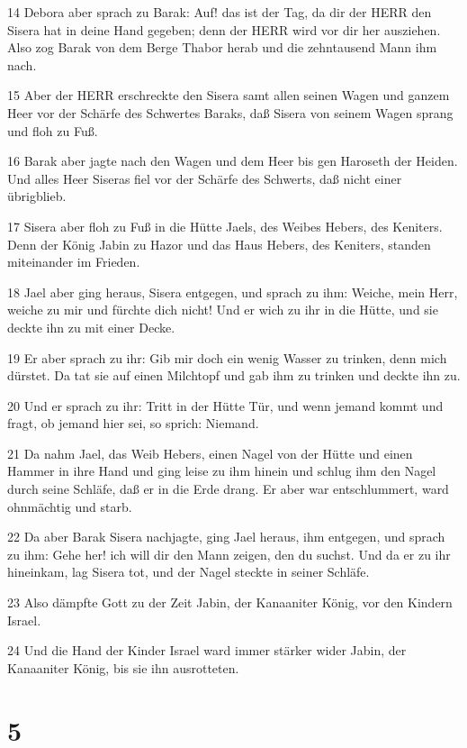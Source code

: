 \par 14 Debora aber sprach zu Barak: Auf! das ist der Tag, da dir der HERR den Sisera hat in deine Hand gegeben; denn der HERR wird vor dir her ausziehen. Also zog Barak von dem Berge Thabor herab und die zehntausend Mann ihm nach.
\par 15 Aber der HERR erschreckte den Sisera samt allen seinen Wagen und ganzem Heer vor der Schärfe des Schwertes Baraks, daß Sisera von seinem Wagen sprang und floh zu Fuß.
\par 16 Barak aber jagte nach den Wagen und dem Heer bis gen Haroseth der Heiden. Und alles Heer Siseras fiel vor der Schärfe des Schwerts, daß nicht einer übrigblieb.
\par 17 Sisera aber floh zu Fuß in die Hütte Jaels, des Weibes Hebers, des Keniters. Denn der König Jabin zu Hazor und das Haus Hebers, des Keniters, standen miteinander im Frieden.
\par 18 Jael aber ging heraus, Sisera entgegen, und sprach zu ihm: Weiche, mein Herr, weiche zu mir und fürchte dich nicht! Und er wich zu ihr in die Hütte, und sie deckte ihn zu mit einer Decke.
\par 19 Er aber sprach zu ihr: Gib mir doch ein wenig Wasser zu trinken, denn mich dürstet. Da tat sie auf einen Milchtopf und gab ihm zu trinken und deckte ihn zu.
\par 20 Und er sprach zu ihr: Tritt in der Hütte Tür, und wenn jemand kommt und fragt, ob jemand hier sei, so sprich: Niemand.
\par 21 Da nahm Jael, das Weib Hebers, einen Nagel von der Hütte und einen Hammer in ihre Hand und ging leise zu ihm hinein und schlug ihm den Nagel durch seine Schläfe, daß er in die Erde drang. Er aber war entschlummert, ward ohnmächtig und starb.
\par 22 Da aber Barak Sisera nachjagte, ging Jael heraus, ihm entgegen, und sprach zu ihm: Gehe her! ich will dir den Mann zeigen, den du suchst. Und da er zu ihr hineinkam, lag Sisera tot, und der Nagel steckte in seiner Schläfe.
\par 23 Also dämpfte Gott zu der Zeit Jabin, der Kanaaniter König, vor den Kindern Israel.
\par 24 Und die Hand der Kinder Israel ward immer stärker wider Jabin, der Kanaaniter König, bis sie ihn ausrotteten.

\chapter{5}

